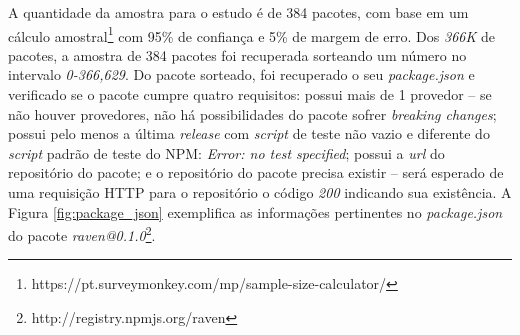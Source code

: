 \begin{table}[!h]
    \caption{Formato da base de dados para cada pacote do NPM}
    \label{tab:database}
\end{table}

A quantidade da amostra para o estudo é de 384 pacotes, com base em um cálculo amostral\footnote{https://pt.surveymonkey.com/mp/sample-size-calculator/} com 95\% de confiança e 5\% de margem de erro. Dos \textit{366K} de pacotes, a amostra de 384 pacotes foi recuperada sorteando um número no intervalo \textit{0-366,629}. Do pacote sorteado, foi recuperado o seu \textit{package.json} e verificado se o pacote cumpre quatro requisitos: possui mais de 1 provedor --  se não houver provedores, não há possibilidades do pacote sofrer \textit{breaking changes}; possui pelo menos a última \textit{release} com \textit{script} de teste não vazio e diferente do \textit{script} padrão de teste do \gls{NPM}: \textit{Error: no test specified}; possui a \textit{url} do repositório do pacote; e o repositório do pacote precisa existir -- será esperado de uma requisição \Gls{HTTP} para o repositório o código \textit{200} indicando sua existência. A Figura \ref{fig:package_json} exemplifica as informações pertinentes no \textit{package.json} do pacote \textit{raven@0.1.0}\footnote{http://registry.npmjs.org/raven}.

